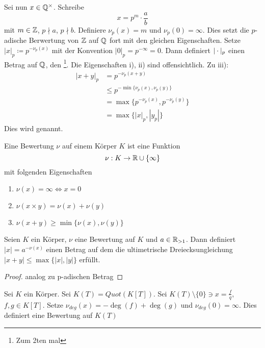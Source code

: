 \documentclass[../main.tex]{subfiles}
\begin{document}
Sei nun $x\in \mathbb{Q}^\times$. Schreibe
$$x=p^m\cdot\frac{a}{b}$$ mit $m\in \mathbb{Z}$, $p\nmid a$, $p\nmid b$.
Definiere $\nu_p(x) = m$ und $\nu_p(0) = \infty$. Dies setzt die $p$-adische Berwertung von $\mathbb{Z}$ auf $\mathbb{Q}$ fort mit den gleichen Eigenschaften.
Setze $|x|_p \coloneqq p^{-\nu_p(x)}$ mit der Konvention $|0|_p = p^{-\infty} = 0$.
Dann definiert $|\cdot|_p$ einen Betrag auf $\mathbb{Q}$, den \footnote{Zum 2ten mal}. Die Eigenschaften i), ii) sind offensichtlich.
Zu iii):
\begin{align*}
    |x+y|_p &= p^{-\nu_p(x+y)}\\
    &\leq p^{-\min\{\nu_p(x),\nu_p(y)\}} \\
    &= \max\{p^{-\nu_p(x)}, p^{-\nu_p(y)}\} \\&
    = \max\{|x|_p,|y_p|\}
\end{align*}
Dies wird  genannt.
\begin{definition}
    Eine Bewertung $\nu$ auf einem Körper $K$ ist eine Funktion $$\nu:K\rightarrow \mathbb{R}\cup \{\infty\}$$
    mit folgenden Eigenschaften
    \begin{enumerate}[label=\roman*)]
        \item $\nu(x) = \infty \Leftrightarrow x= 0$
        \item $\nu(x\times y) = \nu(x)+\nu(y)$
        \item $\nu(x+y) \geq \min\{\nu(x), \nu(y)\}$ 
    \end{enumerate}
\end{definition}
\begin{lemma}
    Seien $K$ ein Körper, $\nu$ eine Bewertung auf $K$ und $a\in \mathbb{R}_{>1}$. Dann definiert $|x| = a^{-\nu(x)}$ einen Betrag auf dem die ultimetrische Dreiecksungleichung $|x+y| \leq \max\{|x|,|y|\}$ erfüllt.
\end{lemma}
\begin{proof}
    analog zu p-adischen Betrag
\end{proof}
\begin{example}
    Sei $K$ ein Körper. Sei $K(T) = Quot(K[T])$.
    Sei $K(T)\setminus\{0\}\ni x = \frac{f}{q}$, $f,g\in K[T]$.
    Setze $\nu_{deg}(x) = -\deg(f)+\deg(g)$ und $\nu_{deg}(0) = \infty$.
    Dies definiert eine Bewertung auf $K(T)$
\end{example}
\end{document}
